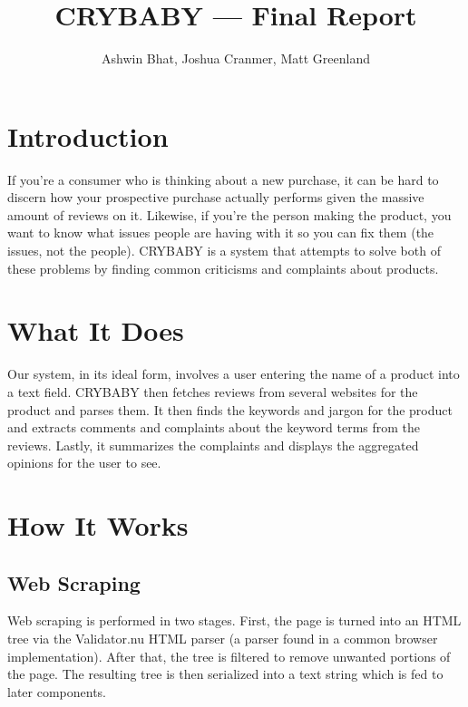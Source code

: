 \documentclass{article}
\title{CRYBABY --- Final Report}
\author{Ashwin Bhat, Joshua Cranmer, Matt Greenland}
\begin{document}
\maketitle
\tableofcontents

\section{Introduction} %

If you're a consumer who is thinking about a new purchase, it can be hard to 
discern how your prospective purchase actually performs given the massive 
amount of reviews on it. Likewise, if you're the person making the product, 
you want to know what issues people are having with it so you can fix them 
(the issues, not the people).  CRYBABY is a system that attempts to solve 
both of these problems by finding common criticisms and complaints about 
products.


\section{What It Does} %

Our system, in its ideal form, involves a user entering the name of a product 
into a text field.  CRYBABY then fetches reviews from several websites for 
the product and parses them.  It then finds the keywords and jargon for the 
product and extracts comments and complaints about the keyword terms from the 
reviews.  Lastly, it summarizes the complaints and displays the aggregated 
opinions for the user to see.


\section{How It Works} %

\subsection{Web Scraping} %

Web scraping is performed in two stages. First, the page is turned into an HTML
tree via the Validator.nu HTML parser (a parser found in a common browser
implementation). After that, the tree is filtered to remove unwanted portions
of the page. The resulting tree is then serialized into a text string which is
fed to later components.
\end{document}
